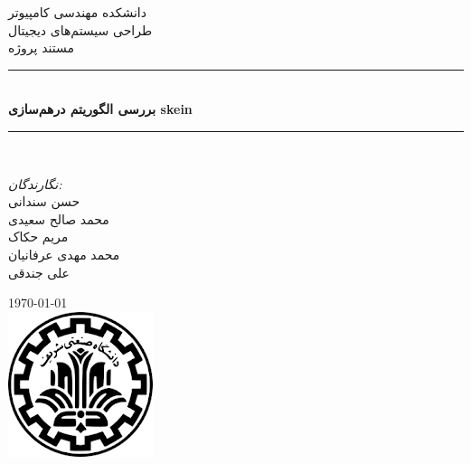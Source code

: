 \documentclass{article}
\begin{document}
\begin{titlepage}
\newcommand{\HRule}{\rule{\linewidth}{0.1mm}} 
\center %
 
    \textsc{\Large دانشکده مهندسی کامپیوتر}\\[0.5cm] %
    \textsc{\Large طراحی سیستم‌های دیجیتال}\\[0.5cm] %
    \textsc{\large مستند پروژه}\\[0.5cm] %

\HRule \\[0.4cm]
    { \huge \bfseries  بررسی الگوریتم درهم‌سازی skein}\\[0.1cm] %
\HRule \\[1.5cm]
 
\begin{minipage}{0.4\textwidth}
\begin{center}

 \large
    
    \emph{نگارندگان:}\\
    حسن سندانی\\
    محمد صالح سعیدی\\
    مریم حکاک\\
    محمد مهدی عرفانیان\\
    علی جندقی
    \end{center}
\end{minipage}
\vspace{10mm}

{\large \today}\\[1cm] %
\includegraphics{figs/sharif.png}%
\vfill %

\end{titlepage}
\end{document}
